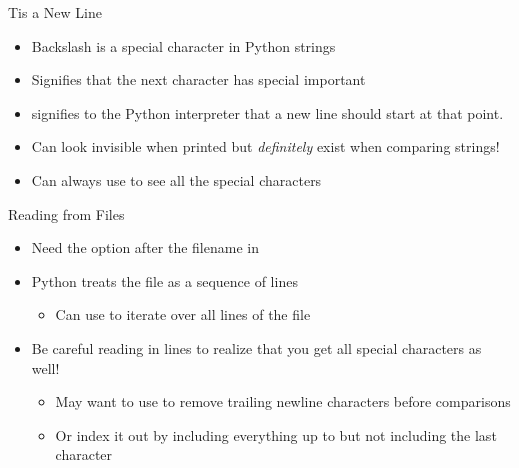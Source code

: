 \documentclass[pdf, aspectratio=169, 12pt]{beamer}
\begin{document}
\begin{frame}{Tis a New Line}
	\begin{itemize}
		\item Backslash is a special character in Python strings
		\item Signifies that the next character has special important
		\item \pyi{\n} signifies to the Python interpreter that a new line should start at that point.
		\item Can look invisible when printed but \emph{definitely} exist when comparing strings!
		\item Can always use  to see all the special characters
	\end{itemize}
\end{frame}

\begin{frame}{Reading from Files}
	\begin{itemize}
		\item Need the option  after the filename in 
		\item Python treats the file as a sequence of lines
			\begin{itemize}
				\item Can use  to iterate over all lines of the file
			\end{itemize}
		\item Be careful reading in lines to realize that you get all special characters as well!
			\begin{itemize}
				\item May want to use  to remove trailing newline characters before comparisons
				\item Or index it out by including everything up to but not including the last character
			\end{itemize}
	\end{itemize}
\end{frame}
\end{document}
